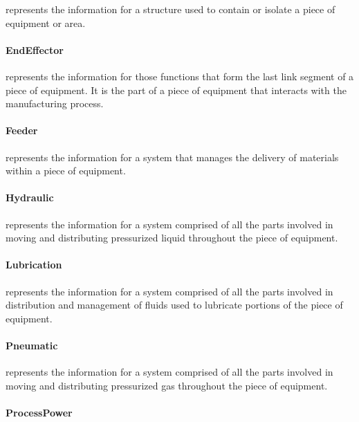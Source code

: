  represents the information for a structure used to contain or isolate a piece of equipment or area.


\paragraph{EndEffector}\mbox{}
\label{sec:EndEffector}


 represents the information for those functions that form the last link segment of a piece of equipment. It is the part of a piece of equipment that interacts with the manufacturing process.


\paragraph{Feeder}\mbox{}
\label{sec:Feeder}


 represents the information for a system that manages the delivery of materials within a piece of equipment.


\paragraph{Hydraulic}\mbox{}
\label{sec:Hydraulic}


 represents the information for a system comprised of all the parts involved in moving and distributing pressurized liquid throughout the piece of equipment.


\paragraph{Lubrication}\mbox{}
\label{sec:Lubrication}


 represents the information for a system comprised of all the parts involved in distribution and management of fluids used to lubricate portions of the piece of equipment.


\paragraph{Pneumatic}\mbox{}
\label{sec:Pneumatic}


 represents the information for a system comprised of all the parts involved in moving and distributing pressurized gas throughout the piece of equipment.


\paragraph{ProcessPower}\mbox{}
\label{sec:ProcessPower}


